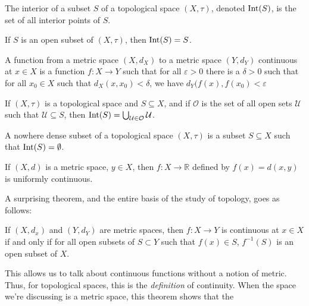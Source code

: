     \begin{definition}
        The interior of a subset $S$ of a topological
        space $(X,\tau)$, denoted $\operatorname{Int}(S)$, is the set
        of all interior points of $S$.
    \end{definition}
    \begin{theorem}
        If $S$ is an open subset of
        $(X,\tau)$, then $\operatorname{Int}(S)=S$.
    \end{theorem}
    \begin{definition}
        A function from a metric space
        $(X,d_{X})$ to a metric space $(Y,d_{Y})$
        continuous at $x\in{X}$ is a function
        $f:X\rightarrow{Y}$ such that
        for all $\varepsilon>0$ there is
        a $\delta>0$ such that for all
        $x_{0}\in{X}$ such that
        $d_{X}(x,x_{0})<\delta$, we have
        $d_{Y}(f(x),f(x_{0})<\varepsilon$
    \end{definition}
    \begin{theorem}
        If $(X,\tau)$ is a topological space and
        $S\subseteq{X}$, and if $\mathcal{O}$ is the set
        of all open sets $\mathcal{U}$ such that
        $\mathcal{U}\subseteq{S}$, then
        $\Int(S)=%
         \bigcup_{\mathcal{U}\in\mathcal{O}}\mathcal{U}$.
    \end{theorem}
    \begin{definition}
        A nowhere dense subset of a topological space
        $(X,\tau)$ is a subset $S\subseteq{X}$ such that
        $\operatorname{Int}(S)=\emptyset$.
    \end{definition}
    \begin{theorem}
        If $(X,d)$ is a metric space,
        $y\in{X}$, then
        $f:X\rightarrow\mathbb{R}$ defined by
        $f(x)=d(x,y)$ is uniformly continuous.
    \end{theorem}
    A surprising theorem, and the entire
    basis of the study of topology, goes as
    follows:
    \begin{theorem}
        If $(X,d_{x})$ and $(Y,d_{Y})$
        are metric spaces, then
        $f:X\rightarrow{Y}$ is continuous
        at $x\in{X}$ if and only if
        for all open subsets
        of $S\subset{Y}$ such that
        $f(x)\in{S}$, $f^{-1}(S)$ is an
        open subset of $X$.
    \end{theorem}
    This allows us to talk about continuous
    functions without a notion of metric.
    Thus, for topological spaces, this is
    the \textit{definition} of continuity.
    When the space we're discussing is a
    metric space, this theorem shows that the
